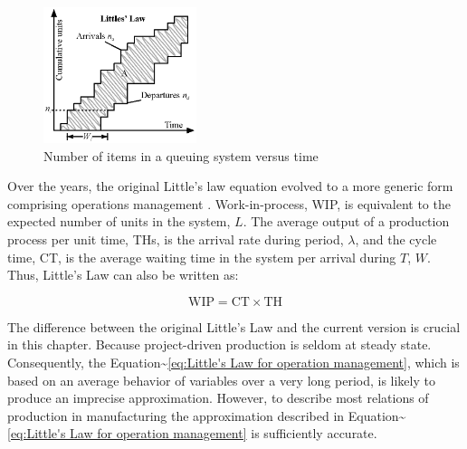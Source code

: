 \documentclass{article}
\begin{document}
\begin{figure}[htbp]
\centering
\includegraphics[height=150]{Figures/Number_of_items_in_a_queuing_system_versus_time.eps}
\caption{\label{fig:orgb843958}Number of items in a queuing system versus time}
\end{figure}

 Over the years, the original Little's law equation \citep{Little1961} evolved to a more generic form comprising operations management \citep{Hopp2001}.
Work-in-process, WIP, is equivalent to the expected number of units in the system, \(L\).
The average output of a production process per unit time, THs, is the arrival rate during period, \(\lambda\), and the cycle time, CT, is the average waiting time in the system per arrival during \(T\), \(W\).
Thus, Little's Law can also be written as:

\begin{equation}
  \mbox{WIP} = \mbox{CT} \times \mbox{TH}
   \label{eq:Little's Law for operation management}
\end{equation}

The difference between the original Little's Law and the current version is crucial in this chapter.
Because project-driven production is seldom at steady state.
Consequently, the Equation\textasciitilde{}\ref{eq:Little's Law for operation management}, which is based on an average behavior of variables over a very long period, is likely to produce an imprecise approximation.
However, to describe most relations of production in manufacturing the approximation described in Equation\textasciitilde{}\ref{eq:Little's Law for operation management} is sufficiently accurate.
\end{document}
